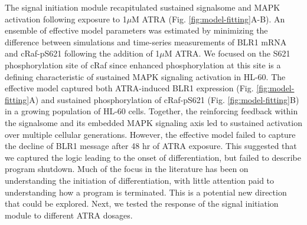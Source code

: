 \documentclass[12pt]{article}
\begin{document}
The signal initiation module recapitulated sustained signalsome and MAPK activation following exposure to 1$\mu$M ATRA (Fig. \ref{fig:model-fitting}A-B).
An ensemble of effective model parameters was estimated by minimizing the difference between simulations and time-series measurements of BLR1 mRNA and
cRaf-pS621 following the addition of 1$\mu$M ATRA. We focused on the S621 phosphorylation site of cRaf since enhanced phosphorylation at this site is a defining
characteristic of sustained MAPK signaling activation in HL-60. The effective model captured both ATRA-induced BLR1 expression (Fig. \ref{fig:model-fitting}A)
and sustained phosphorylation of cRaf-pS621 (Fig. \ref{fig:model-fitting}B) in a growing population of HL-60 cells.
Together, the reinforcing feedback within the signalsome and its embedded MAPK signaling axis led to sustained activation over multiple cellular generations.
However, the effective model failed to capture the decline of BLR1 message after 48 hr of ATRA exposure.
This suggested that we captured the logic leading to the onset of differentiation, but failed to describe program shutdown.
Much of the focus in the literature has been on understanding the initiation of differentiation, with little attention paid to understanding how a program is
terminated. This is a potential new direction that could be explored.
Next, we tested the response of the signal initiation module to different ATRA dosages.

\end{document}
